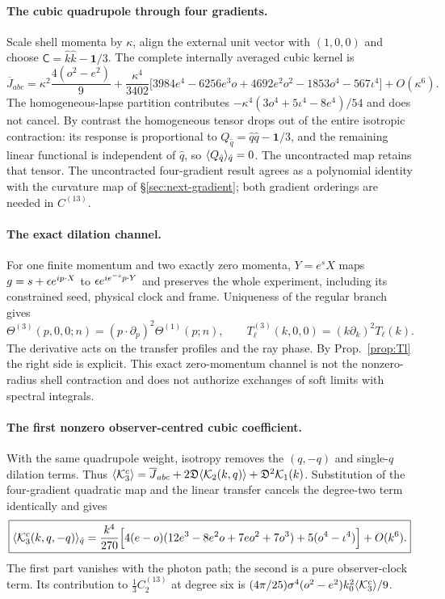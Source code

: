 \paragraph{The cubic quadrupole through four gradients.}
Scale shell momenta by $\kappa$, align the external unit vector with $(1,0,0)$ and choose
$\mathsf C=\hat k\hat k-\mathbf1/3$. The complete internally averaged cubic kernel is
\begin{equation}\label{eq:stationary-four-gradient}
 \overline J_{abc}=\kappa^2\frac{4(o^2-e^2)}9
 +\frac{\kappa^4}{3402}\big[3984e^4-6256e^3o+4692e^2o^2-1853o^4-567\iota^4\big]+O(\kappa^6).
\end{equation}
The homogeneous-lapse partition contributes
$-\kappa^4(3o^4+5\iota^4-8e^4)/54$ and does not cancel. By contrast the homogeneous
tensor drops out of the entire isotropic contraction: its response is proportional to
$Q_{\hat q}=\hat q\hat q-\mathbf1/3$, and the remaining linear functional is independent
of $\hat q$, so $\langle Q_{\hat q}\rangle_{\hat q}=0$. The uncontracted map retains that tensor.
The uncontracted four-gradient result agrees as a polynomial identity with the curvature
map of \S\ref{sec:next-gradient}; both gradient orderings are needed in $C^{(13)}$.

\paragraph{The exact dilation channel.}
For one finite momentum and two exactly zero momenta, $Y=e^sX$ maps
$g=s+\epsilon e^{ip\cdot X}$ to $\epsilon e^{ie^{-s}p\cdot Y}$ and preserves the whole experiment,
including its constrained seed, physical clock and frame. Uniqueness of the regular branch gives
\begin{equation}\label{eq:dilation-channel}
 \boxed{\Theta^{(3)}(p,0,0;n)=(p\cdot\partial_p)^2\Theta^{(1)}(p;n),\qquad
 T^{(3)}_\ell(k,0,0)=(k\partial_k)^2T_\ell(k).}
\end{equation}
The derivative acts on the transfer profiles and the ray phase. By Prop.~\ref{prop:Tl} the
right side is explicit. This exact zero-momentum channel is not the nonzero-radius shell
contraction and does not authorize exchanges of soft limits with spectral integrals.

\paragraph{The first nonzero observer-centred cubic coefficient.}
With the same quadrupole weight, isotropy removes the $(q,-q)$ and single-$q$ dilation terms.
Thus $\langle \mathcal K^c_3\rangle=\overline J_{abc}+2\mathfrak D\langle \mathcal K_2(k,q)\rangle
+\mathfrak D^2\mathcal K_1(k)$. Substitution of the four-gradient quadratic map and the
linear transfer cancels the degree-two term identically and gives
\begin{equation}\label{eq:centred-kappa4}
\boxed{\langle \mathcal K^c_3(k,q,-q)\rangle_{\hat q}=\frac{k^4}{270}\Big[4(e-o)(12e^3-8e^2o+7eo^2+7o^3)
+5(o^4-\iota^4)\Big]+O(k^6).}
\end{equation}
The first part vanishes with the photon path; the second is a pure observer-clock term.
Its contribution to $\frac13C^{(13)}_2$ at degree six is
$(4\pi/25)\sigma^4(o^2-e^2)k_0^2\langle \mathcal K^c_3\rangle/9$.

